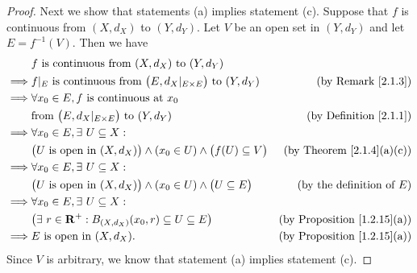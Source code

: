 \begin{proof}
    Next we show that statements (a) implies statement (c).
    Suppose that \(f\) is continuous from \((X, d_X)\) to \((Y, d_Y)\).
    Let \(V\) be an open set in \((Y, d_Y)\) and let \(E = f^{-1}(V)\).
    Then we have
    \begin{align*}
                 & f \text{ is continuous from } (X, d_X) \text{ to } (Y, d_Y)                                                                           \\
        \implies & f|_{E} \text{ is continuous from } \big(E, d_X|_{E \times E}\big) \text{ to } (Y, d_Y)      & \text{(by Remark \ref{2.1.3})}          \\
        \implies & \forall x_0 \in E, f \text{ is continuous at } x_0                                                                                    \\
                 & \text{from } \big(E, d_X|_{E \times E}\big) \text{ to } (Y, d_Y)                            & \text{(by Definition \ref{2.1.1})}      \\
        \implies & \forall x_0 \in E, \exists\ U \subseteq X :                                                                                           \\
                 & \big(U \text{ is open in } (X, d_X)\big) \land (x_0 \in U) \land \big(f(U) \subseteq V\big) & \text{(by Theorem \ref{2.1.4}(a)(c))}   \\
        \implies & \forall x_0 \in E, \exists\ U \subseteq X :                                                                                           \\
                 & \big(U \text{ is open in } (X, d_X)\big) \land (x_0 \in U) \land \big(U \subseteq E\big)    & \text{(by the definition of \(E\))}     \\
        \implies & \forall x_0 \in E, \exists\ U \subseteq X :                                                                                           \\
                 & \big(\exists\ r \in \mathbf{R}^+ : B_{(X, d_X)}(x_0, r) \subseteq U \subseteq E\big)                & \text{(by Proposition \ref{1.2.15}(a))} \\
        \implies & E \text{ is open in } (X, d_X).                                                             & \text{(by Proposition \ref{1.2.15}(a))}
    \end{align*}
    Since \(V\) is arbitrary, we know that statement (a) implies statement (c).


\end{proof}
